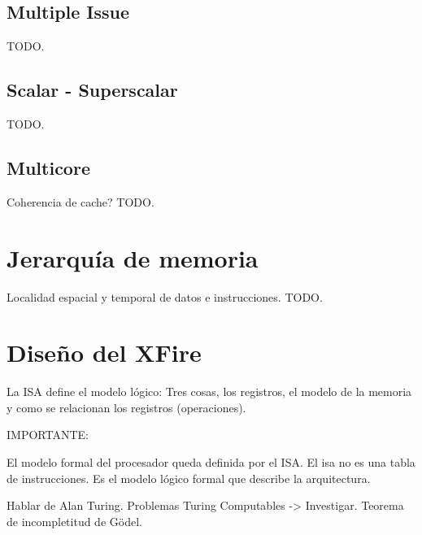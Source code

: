 \subsection{Multiple Issue}
\label{subsec:optimizations-multiple_issue}

TODO.

\subsection{Scalar - Superscalar}
\label{subsec:optimizations-scalar_superscalar}

TODO.

\subsection{Multicore}
\label{subsec:optimizations-multicore}

Coherencia de cache?
TODO.

\section{Jerarquía de memoria}
\label{sec:mem_hierarchy}

Localidad espacial y temporal de datos e instrucciones. TODO.

\section{Diseño del XFire}

La ISA define el modelo lógico: Tres cosas, los registros, el modelo de la
memoria y como se relacionan los registros (operaciones).



IMPORTANTE:

El modelo formal del procesador queda definida por el ISA. El isa no es una tabla de instrucciones. Es el modelo lógico formal que describe la arquitectura.

Hablar de Alan Turing. Problemas Turing Computables -> Investigar. Teorema de incompletitud de Gödel.
